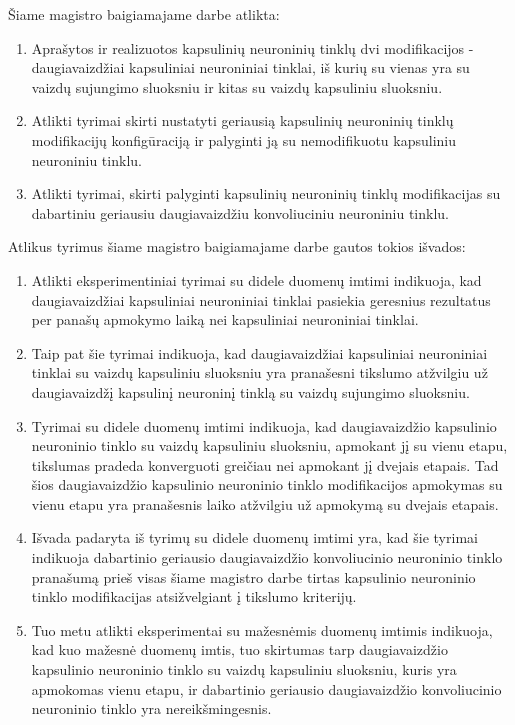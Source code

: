 
Šiame magistro baigiamajame darbe atlikta:

\begin{enumerate}
	\item Aprašytos ir realizuotos kapsulinių neuroninių tinklų dvi modifikacijos - daugiavaizdžiai kapsuliniai neuroniniai tinklai, iš kurių su vienas yra su vaizdų sujungimo sluoksniu ir kitas su vaizdų kapsuliniu sluoksniu.
	\item Atlikti tyrimai skirti nustatyti geriausią kapsulinių neuroninių tinklų modifikacijų konfigūraciją ir palyginti ją su nemodifikuotu kapsuliniu neuroniniu tinklu.
	\item Atlikti tyrimai, skirti palyginti kapsulinių neuroninių tinklų modifikacijas su dabartiniu geriausiu daugiavaizdžiu konvoliuciniu neuroniniu tinklu.
\end{enumerate}

Atlikus tyrimus šiame magistro baigiamajame darbe gautos tokios išvados:

\begin{enumerate}
	\item Atlikti eksperimentiniai tyrimai su didele duomenų imtimi indikuoja, kad daugiavaizdžiai kapsuliniai neuroniniai tinklai pasiekia geresnius rezultatus per panašų apmokymo laiką nei kapsuliniai neuroniniai tinklai.
	\item Taip pat šie tyrimai indikuoja, kad daugiavaizdžiai kapsuliniai neuroniniai tinklai su vaizdų kapsuliniu sluoksniu yra pranašesni tikslumo atžvilgiu už daugiavaizdžį kapsulinį neuroninį tinklą su vaizdų sujungimo sluoksniu.
	\item Tyrimai su didele duomenų imtimi indikuoja, kad daugiavaizdžio kapsulinio neuroninio tinklo su vaizdų kapsuliniu sluoksniu, apmokant jį su vienu etapu, tikslumas pradeda konverguoti greičiau nei apmokant jį dvejais etapais. Tad šios daugiavaizdžio kapsulinio neuroninio tinklo modifikacijos apmokymas su vienu etapu yra pranašesnis laiko atžvilgiu už apmokymą su dvejais etapais.
	\item Išvada padaryta iš tyrimų su didele duomenų imtimi yra, kad šie tyrimai indikuoja dabartinio geriausio daugiavaizdžio konvoliucinio neuroninio tinklo pranašumą prieš visas šiame magistro darbe tirtas kapsulinio neuroninio tinklo modifikacijas atsižvelgiant į tikslumo kriterijų.
	\item Tuo metu atlikti eksperimentai su mažesnėmis duomenų imtimis indikuoja, kad kuo mažesnė duomenų imtis, tuo skirtumas tarp daugiavaizdžio kapsulinio neuroninio tinklo su vaizdų kapsuliniu sluoksniu, kuris yra apmokomas vienu etapu, ir dabartinio geriausio daugiavaizdžio konvoliucinio neuroninio tinklo yra nereikšmingesnis.
\end{enumerate}

